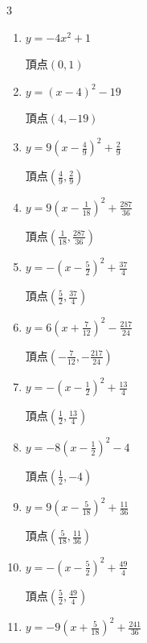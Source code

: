 \begin{multicols}{3}
\begin{enumerate}
\columnbreak %

  \item $\displaystyle y=-4x^{2}+1$

        $\displaystyle 頂点\left( 0 , 1 \right)$

  \item $\displaystyle y=\left( x-4\right)^{2}-19$

        $\displaystyle 頂点\left( 4 , -19 \right)$

  \item $\displaystyle y=9\left( x-\frac{4}{9}\right)^{2}+\frac{2}{9}$

        $\displaystyle 頂点\left( \frac{4}{9} , \frac{2}{9} \right)$

  \item $\displaystyle y=9\left( x-\frac{1}{18}\right)^{2}+\frac{287}{36}$

        $\displaystyle 頂点\left( \frac{1}{18} , \frac{287}{36} \right)$

  \item $\displaystyle y=-\left( x-\frac{5}{2}\right)^{2}+\frac{37}{4}$

        $\displaystyle 頂点\left( \frac{5}{2} , \frac{37}{4} \right)$

  \item $\displaystyle y=6\left( x+\frac{7}{12}\right)^{2}-\frac{217}{24}$

        $\displaystyle 頂点\left( -\frac{7}{12} , -\frac{217}{24} \right)$

  \item $\displaystyle y=-\left( x-\frac{1}{2}\right)^{2}+\frac{13}{4}$

        $\displaystyle 頂点\left( \frac{1}{2} , \frac{13}{4} \right)$

  \item $\displaystyle y=-8\left( x-\frac{1}{2}\right)^{2}-4$

        $\displaystyle 頂点\left( \frac{1}{2} , -4 \right)$

  \item $\displaystyle y=9\left( x-\frac{5}{18}\right)^{2}+\frac{11}{36}$

        $\displaystyle 頂点\left( \frac{5}{18} , \frac{11}{36} \right)$

  \item $\displaystyle y=-\left( x-\frac{5}{2}\right)^{2}+\frac{49}{4}$

        $\displaystyle 頂点\left( \frac{5}{2} , \frac{49}{4} \right)$

  \item $\displaystyle y=-9\left( x+\frac{5}{18}\right)^{2}+\frac{241}{36}$


\end{enumerate}
\end{multicols}
